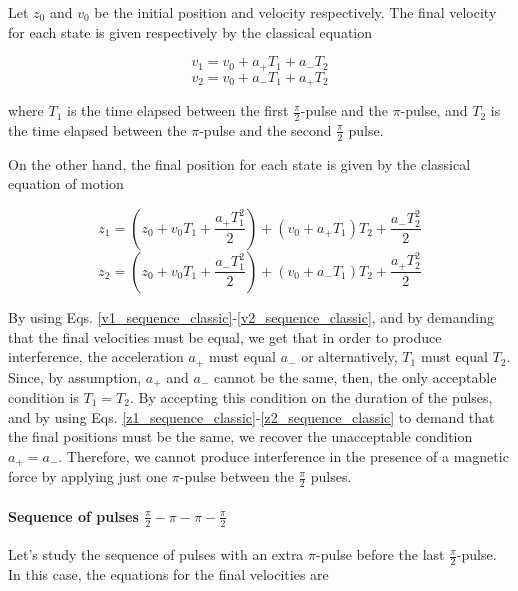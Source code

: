 \documentclass{article}
\begin{document}
Let $z_0$ and $v_0$ be the initial position and velocity respectively. The final velocity for each state is given respectively by the classical equation

\begin{equation}\label{v1_sequence_classic}
v_{1} = v_{0} + a_{+} T_{1} + a_{-} T_{2}
\end{equation}
\begin{equation}\label{v2_sequence_classic}
v_{2} = v_{0} + a_{-} T_{1} + a_{+} T_{2}
\end{equation}

where $T_{1}$ is the time elapsed between the first $\frac{\pi}{2}$-pulse and the $\pi$-pulse, and $T_{2}$ is the time elapsed between the $\pi$-pulse and the second $\frac{\pi}{2}$ pulse.

On the other hand, the final position for each state is given by the classical equation of motion

\begin{equation}\label{z1_sequence_classic}
z_{1} = (z_{0} + v_{0} T_{1} + \frac{a_{+} T^{2}_{1}}{2}) + (v_{0}+a_{+}T_{1})T_{2} + \frac{a_{-} T^{2}_{2}}{2}
\end{equation}
\begin{equation}\label{z2_sequence_classic}
z_{2} = (z_{0} + v_{0} T_{1} + \frac{a_{-} T^{2}_{1}}{2}) + (v_{0}+a_{-}T_{1})T_{2} + \frac{a_{+} T^{2}_{2}}{2}
\end{equation}

By using Eqs. \ref{v1_sequence_classic}-\ref{v2_sequence_classic}, and by demanding that the final velocities must be equal, we get that in order to produce interference, the acceleration $a_{+}$ must equal $a_{-}$ or alternatively, $T_{1}$ must equal $T_{2}$. Since, by assumption, $a_{+}$ and $a_{-}$ cannot be the same, then, the only acceptable condition is $T_{1}=T_{2}$. By accepting this condition on the duration of the pulses, and by using Eqs. \ref{z1_sequence_classic}-\ref{z2_sequence_classic} to demand that the final positions must be the same, we recover the unacceptable condition $a_{+}=a_{-}$. Therefore, we cannot produce interference in the presence of a magnetic force by applying just one $\pi$-pulse between the $\frac{\pi}{2}$ pulses.

\paragraph{Sequence of pulses $\frac{\pi}{2} - \pi - \pi - \frac{\pi}{2}$}

Let's study the sequence of pulses with an extra $\pi$-pulse before the last $\frac{\pi}{2}$-pulse. In this case, the equations for the final velocities are
\end{document}
